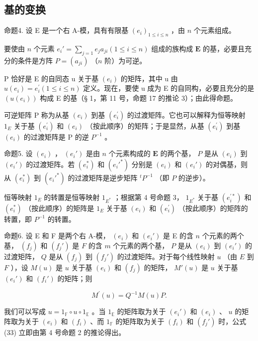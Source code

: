 \subsection{基的变换}

命题4. 设 E 是一个右 A-模，具有有限基 \((e_i)_{1 \leqslant i \leqslant n}\) ，由 \(n\) 个元素组成。

要使由 \(n\) 个元素 \(e_i' = \sum_{j=1} e_j a_{ji} (1 \leqslant i \leqslant n)\) 组成的族构成 \(\mathbf{E}\) 的基，必要且充分的条件是方阵 \(P = (a_{ji})\) （\(n\) 阶）为可逆。

P 恰好是 E 的自同态 u 关于基 \((e_{i})\) 的矩阵，其中 u 由 \(u(e_{i}) = e_{i}^{\prime} (1 \leqslant i \leqslant n)\) 定义。现在，要使 u 成为 E 的自同构，必要且充分的是 \((u(e_{i}))\) 构成 E 的基（§ 1，第 11 号，命题 17 的推论 3）；由此得命题。

可逆矩阵 P 称为从基 \((e_{i})\) 到基 \((e_{i}^{\prime})\) 的过渡矩阵。它也可以解释为恒等映射 \(1_{E}\) 关于基 \((e_{i}^{\prime})\) 和 \((e_{i})\) （按此顺序）的矩阵；于是显然，从基 \((e_{i}^{\prime})\) 到基 \((e_{i})\) 的过渡矩阵是 P 的逆 \(P^{-1}\) 。

命题5. 设 \((e_i)\) ， \((e_i')\) 是由 \(n\) 个元素构成的 \(\mathbf{E}\) 的两个基， \(P\) 是从 \((e_i)\) 到 \((e_i')\) 的过渡矩阵。若 \((e_i^*)\) 和 \((e_i'^*)\) 分别是 \((e_i)\) 和 \((e_i')\) 的对偶基，则从 \((e_i^*)\) 到 \((e_i'^*)\) 的过渡矩阵是逆步矩阵 \(^t P^{-1}\) （即 \(P\) 的逆步）。

恒等映射 \(1_{E}\) 的转置是恒等映射 \(1_{E^{*}}\) ；根据第 4 号命题 3， \(1_{E^{*}}\) 关于基 \((e_{i}^{\prime*})\) 和 \((e_{i}^{*})\) （按此顺序）的矩阵是 \(1_{E}\) 关于基 \((e_{i})\) 和 \((e_{i}^{\prime})\) （按此顺序）的矩阵的转置，即 \(P^{-1}\) 的转置。

命题6. 设 E 和 F 是两个右 A-模， \((e_i)\) 和 \((e_i')\) 是 E 的含 \(n\) 个元素的两个基， \((f_j)\) 和 \((f_j')\) 是 \(F\) 的含 \(m\) 个元素的两个基， \(P\) 是从 \((e_i)\) 到 \((e_i')\) 的过渡矩阵， \(Q\) 是从 \((f_j)\) 到 \((f_j')\) 的过渡矩阵。对于每个线性映射 \(u\) （由 \(E\) 到 \(F\) ），设 \(M(u)\) 是 \(u\) 关于基 \((e_i)\) 和 \((f_j)\) 的矩阵， \(M'(u)\) 是 \(u\) 关于基 \((e_i')\) 和 \((f_i')\) 的矩阵；则

\[
M ^ {\prime} (u) = Q ^ {- 1} M (u) P.\tag{33 D}
\]

我们可以写成 \(u = 1_{\mathbb{F}} \circ u \circ 1_{\mathbb{E}}\) 。当 \(1_{\mathbb{E}}\) 的矩阵取为关于 \((e_i')\) 和 \((e_i)\) 、 \(u\) 的矩阵取为关于 \((e_i)\) 和 \((f_i)\) 、而 \(1_{\mathbb{F}}\) 的矩阵取为关于 \((f_i)\) 和 \((f_j')\) 时，公式 (33) 立即由第 4 号命题 2 的推论得出。

